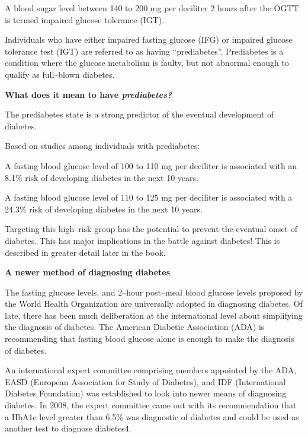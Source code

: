  \item A blood sugar level between 140 to 200 mg per deciliter 2 hours after the OGTT is termed impaired glucose tolerance (IGT).

Individuals who have either impaired fasting glucose (IFG) or impaired glucose tolerance test (IGT) are referred to as having “prediabetes”. Prediabetes is a condition where the glucose metabolism is faulty, but not abnormal enough to qualify as full–blown diabetes.

\textbf{What does it mean to have \textit{prediabetes?}}

The prediabetes state is a strong predictor of the eventual development of diabetes.

Based on studies among individuals with prediabetes:

\item A fasting blood glucose level of 100 to 110 mg per deciliter is associated with an 8.1\% risk of developing diabetes in the next 10 years.

 \item A fasting blood glucose level of 110 to 125 mg per deciliter is associated with a 24.3\% risk of developing diabetes in the next 10 years.

 Targeting this high–risk group has the potential to prevent the eventual onset of diabetes. This has major implications in the battle against diabetes! This is described in greater detail later in the book.

\textbf{A newer method of diagnosing diabetes}

The fasting glucose levels, and 2–hour post–meal blood glucose levels proposed by the World Health Organization are universally adopted in diagnosing diabetes. Of late, there has been much deliberation at the international level about simplifying the diagnosis of diabetes. The American Diabetic Association (ADA) is recommending that fasting blood glucose alone is enough to make the diagnosis of diabetes.

An international expert committee comprising members appointed by the ADA, EASD (European Association for Study of Diabetes), and IDF (International Diabetes Foundation) was established to look into newer means of diagnosing diabetes. In 2008, the expert committee came out with its recommendation that a HbA1c level greater than 6.5\% was diagnostic of diabetes and could be used as another test to diagnose diabetes4.

